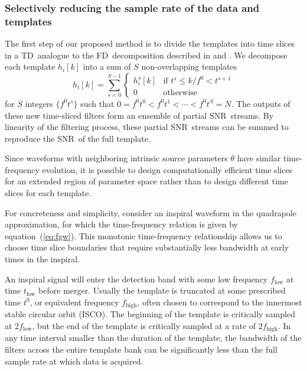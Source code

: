 \documentclass[preprint2]{aastex}
\newcommand{\ISCO}{ISCO}%
\newcommand{\SNR}{SNR}%
\newcommand{\TD}{TD}%
\newcommand{\FD}{FD}%
\begin{document}
\subsubsection{Selectively reducing the sample rate of the data and templates}
\label{sec:time-slices}

The first step of our proposed method is to divide the templates into time
slices in a \TD\ analogue to the \FD\ decomposition described
in \citet{Marion2004} and \citet{Buskulic2010}.  We decompose each template
$h_{i}[k]$ into a sum of $S$ non-overlapping templates
%
\begin{equation}
\label{eq:time-slices}
h_{i}[k] = \sum_{s=0}^{S-1}
	\begin{cases}
		h_i^s[k] & \textrm{if } t^s \leqslant k / f^0 < t^{s+1} \\
		0 & \textrm{otherwise}
	\end{cases}
\end{equation}
%
for $S$ integers $\{f^0 t^s\}$ such that $0  = f^0 t^0 < f^0 t^1 < \cdots < f^0
t^S = N$.  The outputs of these new time-sliced filters
form an ensemble of partial \SNR\ streams.  By linearity of the filtering
process, these partial \SNR\ streams can be summed to reproduce the
\SNR\ of the full template.

Since waveforms with neighboring intrinsic source parameters $\theta$
 have similar time-frequency evolution, it is possible to design computationally
efficient time slices for an extended region of parameter space rather than to
design different time slices for each template.

For concreteness and simplicity, consider an inspiral waveform in the
quadrapole approximation, for which the time-frequency relation is given by equation~(\ref{eq:fgw}).
This monotonic time-frequency relationship allows us
to choose time slice boundaries that require substantially less bandwidth at
early times in the inspiral.

An inspiral signal will enter the detection band with some low frequency
$f_\mathrm{low}$ at time $t_\mathrm{low}$ before merger.  Usually the template
is truncated at some prescribed time $t^0$, or equivalent frequency $f_\mathrm{high}$,
often chosen to correspond to the innermost stable circular orbit (\ISCO). The beginning of the template is critically
sampled at $2 f_\mathrm{low}$, but the end of the template is critically sampled at a
rate of $2 f_\mathrm{high}$. In any time interval smaller than the duration of the template,
the bandwidth of the filters across the entire template bank can be significantly less
than the full sample rate at which data is acquired.
\end{document}
